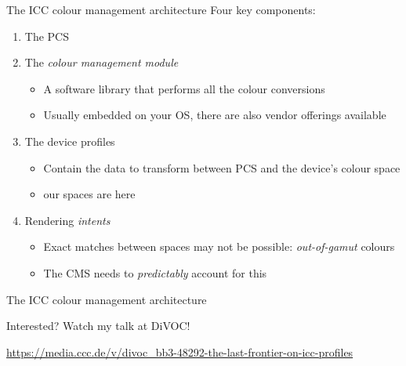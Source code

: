 \documentclass[aspectratio=169,handout,usepdftitle=false]{fireshonks}
\begin{document}
\begin{frame}{The ICC colour management architecture}
    Four key components:
    \begin{enumerate}[<+(1)->]
        \item The PCS
        \item The \emph{colour management module}
              \begin{itemize}
                  \item A software library that performs all the colour conversions
                  \item Usually embedded on your OS, there are also vendor offerings available
              \end{itemize}
        \item The device profiles
              \begin{itemize}
                  \item Contain the data to transform between PCS and the device's colour space
                  \item {} our spaces are here
              \end{itemize}
        \item Rendering \emph{intents}
              \begin{itemize}
                  \item Exact matches between spaces may not be possible: \emph{out-of-gamut} colours
                  \item The CMS needs to \emph{predictably} account for this
              \end{itemize}
    \end{enumerate}
\end{frame}
\begin{frame}{The ICC colour management architecture}
    \begin{center}
        Interested? Watch my talk at DiVOC!


        \url{https://media.ccc.de/v/divoc_bb3-48292-the-last-frontier-on-icc-profiles}
    \end{center}
\end{frame}
\end{document}
